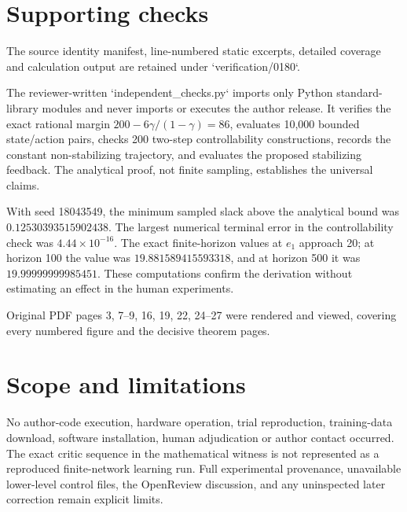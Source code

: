 \documentclass[10pt]{article}
\begin{document}
\section*{Supporting checks}
The source identity manifest, line-numbered static excerpts, detailed coverage and calculation output are retained under `verification/0180`.\par
The reviewer-written `independent\_checks.py` imports only Python standard-library modules and never imports or executes the author release. It verifies the exact rational margin \(200-6\gamma/(1-\gamma)=86\), evaluates 10,000 bounded state/action pairs, checks 200 two-step controllability constructions, records the constant non-stabilizing trajectory, and evaluates the proposed stabilizing feedback. The analytical proof, not finite sampling, establishes the universal claims.\par
With seed 18043549, the minimum sampled slack above the analytical bound was \(0.12530393515902438\). The largest numerical terminal error in the controllability check was \(4.44\times10^{-16}\). The exact finite-horizon values at \(e_1\) approach 20; at horizon 100 the value was \(19.881589415593318\), and at horizon 500 it was \(19.99999999985451\). These computations confirm the derivation without estimating an effect in the human experiments.\par
Original PDF pages 3, 7–9, 16, 19, 22, 24–27 were rendered and viewed, covering every numbered figure and the decisive theorem pages.\par
\section*{Scope and limitations}
No author-code execution, hardware operation, trial reproduction, training-data download, software installation, human adjudication or author contact occurred. The exact critic sequence in the mathematical witness is not represented as a reproduced finite-network learning run. Full experimental provenance, unavailable lower-level control files, the OpenReview discussion, and any uninspected later correction remain explicit limits.\par
\end{document}
